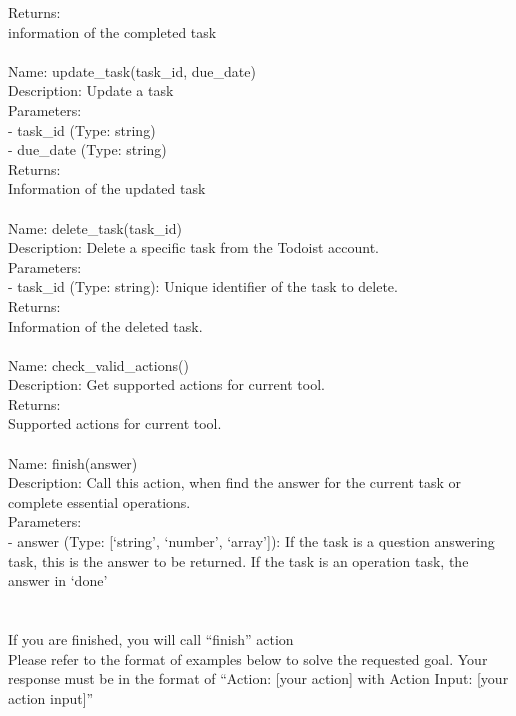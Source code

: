 \begin{tcolorbox}[breakable,title=Prompt Details for Todo]
Returns:\\
information of the completed task\\
\\
Name: update\_task(task\_id, due\_date)\\
Description: Update a task\\
Parameters:\\
- task\_id (Type: string)\\
- due\_date (Type: string)\\
Returns:\\
Information of the updated task\\
\\
Name: delete\_task(task\_id)\\
Description: Delete a specific task from the Todoist account.\\
Parameters:\\
- task\_id (Type: string): Unique identifier of the task to delete.\\
Returns:\\
Information of the deleted task.\\
\\
Name: check\_valid\_actions()\\
Description: Get supported actions for current tool.\\
Returns:\\
Supported actions for current tool.\\
\\
Name: finish(answer)\\
Description: Call this action, when find the answer for the current task or complete essential operations.\\
Parameters:\\
- answer (Type: [`string', `number', `array']): If the task is a question answering task, this is the answer to be returned. If the task is an operation task, the answer in `done'\\
\\
\\
If you are finished, you will call ``finish'' action\\
Please refer to the format of examples below to solve the requested goal. Your response must be in the format of ``Action: [your action] with Action Input: [your action input]''\\

\end{tcolorbox}
